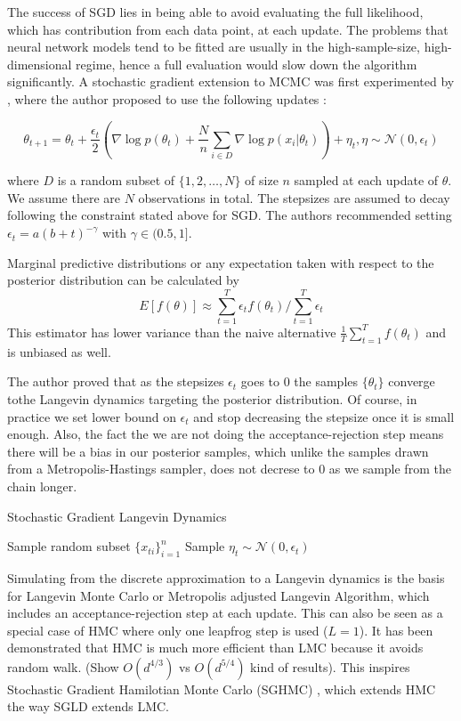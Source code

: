 \documentclass{book}
\begin{document}
\begin{enumerate}
The success of SGD lies in being able to avoid evaluating the full likelihood, which has contribution from each data point, at each update. The problems that neural network models tend to be fitted are usually in the high-sample-size, high-dimensional regime, hence a full evaluation would slow down the algorithm significantly. A stochastic gradient extension to MCMC was first experimented by \cite{welling2011bayesian}, where the author proposed to use the following updates :

\[\theta_{t+1} = \theta_t + \frac{\epsilon_t}{2} ( \nabla \log p(\theta_t) + \frac{N}{n} \sum_{i \in D} \nabla \log p(x_i|\theta_t) ) + \eta_t , \eta \sim \mathcal{N}(0,\epsilon_t) \]

where $D$ is a random subset of $\{1,2, \dots, N\}$ of size $n$ sampled at each update of $\theta$. We assume there are $N$ observations in total. The stepsizes are assumed to decay following the constraint stated above for SGD. The authors recommended setting $\epsilon_t = a(b+t)^{-\gamma} $ with $\gamma \in (0.5,1]$.  

Marginal predictive distributions or any expectation taken with respect to the posterior distribution can be calculated by 
\[ E[f(\theta)] \approx \sum_{t=1}^T \epsilon_t f(\theta_t) / \sum_{t=1}^T \epsilon_t \] 
This estimator has lower variance than the naive alternative $\frac{1}{T} \sum_{t=1}^T f(\theta_t) $ and is unbiased as well. 

The author proved that as the stepsizes $\epsilon_t$ goes to $0$ the samples $\{\theta_t\}$ converge tothe Langevin dynamics targeting the posterior distribution. Of course, in practice we set lower bound on $\epsilon_t$ and stop decreasing the stepsize once it is small enough. Also, the fact the we are not doing the acceptance-rejection step means there will be a bias in our posterior samples, which unlike the samples drawn from a Metropolis-Hastings sampler, does not decrese to $0$ as we sample from the chain longer.

\begin{algorithm}
    \caption{Stochastic Gradient Langevin Dynamics}
    \State Sample random subset $\{x_{ti}\}_{i=1}^n$
    \State Sample $\eta_t \sim \mathcal{N}(0,\epsilon_t) $
    \EndFor
\end{algorithm}
Simulating from the discrete approximation to a Langevin dynamics is the basis
for Langevin Monte Carlo or Metropolis adjusted Langevin Algorithm, which
includes an acceptance-rejection step at each update. This can also be seen as a
special case of HMC where only one leapfrog step is used ($L=1$). It has been
demonstrated that HMC is much more efficient than LMC because it avoids random
walk. (Show $O(d^{4/3})$ vs $O(d^{5/4})$ kind of results). This inspires
Stochastic Gradient Hamilotian Monte Carlo (SGHMC) \cite{chen2014stochastic},
which extends HMC the way SGLD extends LMC. 


\end{enumerate}
\end{document}
